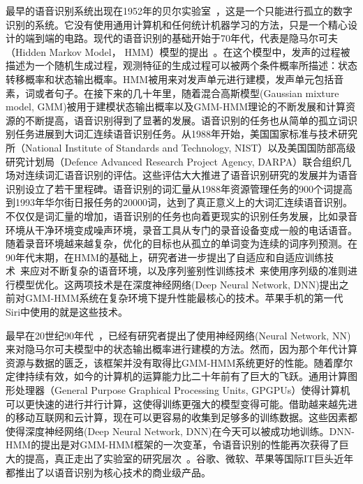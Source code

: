 最早的语音识别系统出现在1952年的贝尔实验室~\cite{davis1952automatic}，这是一个只能进行孤立的数字识别的系统。它没有使用通用计算机和任何统计机器学习的方法，只是一个精心设计的端到端的电路。现代的语音识别的基础开始于70年代，代表是隐马尔可夫（Hidden Markov Model， HMM）模型的提出~\cite{baker1975dragon, jelinek1976continuous}。在这个模型中，发声的过程被描述为一个随机生成过程，观测特征的生成过程可以被两个条件概率所描述：状态转移概率和状态输出概率。HMM被用来对发声单元进行建模，发声单元包括音素，词或者句子。在接下来的几十年里，随着混合高斯模型(Gaussian mixture model, GMM)被用于建模状态输出概率以及GMM-HMM理论的不断发展和计算资源的不断提高，语音识别得到了显著的发展。语音识别的任务也从简单的孤立词识别任务进展到大词汇连续语音识别任务。从1988年开始，美国国家标准与技术研究所（National Institute of Standards and Technology, NIST）以及美国国防部高级研究计划局（Defence Advanced Research Project Agency, DARPA）联合组织几场对连续词汇语音识别的评估。这些评估大大推进了语音识别研究的发展并为语音识别设立了若干里程碑。语音识别的词汇量从1988年资源管理任务的900个词提高到1993年华尔街日报任务的20000词，达到了真正意义上的大词汇连续语音识别。不仅仅是词汇量的增加，语音识别的任务也向着更现实的识别任务发展，比如录音环境从干净环境变成噪声环境，录音工具从专门的录音设备变成一般的电话语音。随着录音环境越来越复杂，优化的目标也从孤立的单词变为连续的词序列预测。在90年代末期，在HMM的基础上，研究者进一步提出了自适应和自适应训练技术~\cite{anastasakos1996compact,digalakis1995speaker,furui1989unsupervised,gales1998cluster,gales1998maximum,gales2001adaptive,gales2001multiple,gauvain1994maximum,kuhn1998eigenvoices,lee1996speaker,leggetter1995maximum,neumeyer1995comparative,pye1997experiments}来应对不断复杂的语音环境，以及序列鉴别性训练技术~\cite{bahl1986maximum,schluter2001comparison,chou1993minimum,goel2000minimum,juang1997minimum,povey2005discriminative,povey2001improved}来使用序列级的准则进行模型优化。这两项技术是在深度神经网络(Deep Neural Network, DNN)提出之前对GMM-HMM系统在复杂环境下提升性能最核心的技术。苹果手机的第一代Siri中使用的就是这些技术。

最早在20世纪90年代~\cite{bourlard1989continuous,bourlard1992cdnn,bourlard2012connectionist}，已经有研究者提出了使用神经网络(Neural Network, NN)来对隐马尔可夫模型中的状态输出概率进行建模的方法。然而，因为那个年代计算资源与数据的匮乏，该框架并没有取得比GMM-HMM系统更好的性能。随着摩尔定律持续有效，如今的计算机的运算能力比二十年前有了巨大的飞跃。通用计算图形处理器（General Purpose Graphical Processing Units, GPGPUs）使得计算机可以更快速的进行并行计算，这使得训练更强大的模型变得可能。借助越来越先进的移动互联网和云计算，现在可以更容易的收集到足够多的训练数据。这些因素都使得深度神经网络(Deep Neural Network, DNN)在今天可以被成功地训练。DNN-HMM的提出是对GMM-HMM框架的一次变革，令语音识别的性能再次获得了巨大的提高，真正走出了实验室的研究层次~\cite{ASRBook-Yu2014,CD-DNN-HMM-dahl2012,DNN4ASR-hinton2012,qian2016very,TDNN-peddinti2015,Deepspeech2-amodei2015,LACE-yu2016,xiong2017microsoft}。谷歌、微软、苹果等国际IT巨头近年都推出了以语音识别为核心技术的商业级产品。

